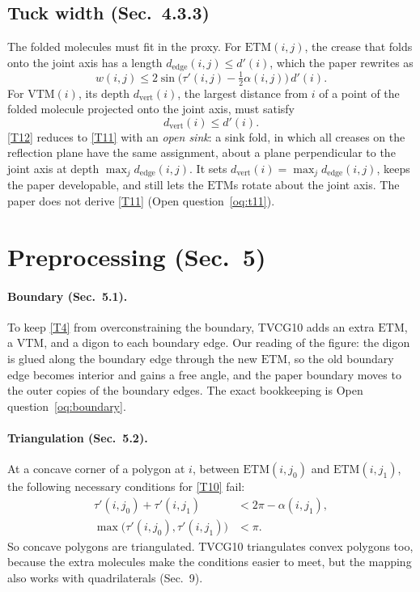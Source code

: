 \documentclass[11pt]{article}
\theoremstyle{definition}
\newcommand{\ETM}{\mathrm{ETM}}
\newcommand{\VTM}{\mathrm{VTM}}
\begin{document}
\subsection{Tuck width (Sec.~4.3.3)}

The folded molecules must fit in the proxy. For $\ETM(i,j)$, the crease that
folds onto the joint axis has a length $d_{\mathrm{edge}}(i,j) \le d'(i)$, which
the paper rewrites as
\begin{equation}
  w(i,j) \le 2 \sin\bigl(\tau'(i,j) - \tfrac12\alpha(i,j)\bigr)\, d'(i).
  \tag{T11}\label{T11}
\end{equation}
For $\VTM(i)$, its depth $d_{\mathrm{vert}}(i)$, the largest distance from $i$
of a point of the folded molecule projected onto the joint axis, must satisfy
\begin{equation}
  d_{\mathrm{vert}}(i) \le d'(i). \tag{T12}\label{T12}
\end{equation}
\eqref{T12} reduces to \eqref{T11} with an \emph{open sink}: a sink fold, in
which all creases on the reflection plane have the same assignment, about a
plane perpendicular to the joint axis at depth $\max_j d_{\mathrm{edge}}(i,j)$.
It sets $d_{\mathrm{vert}}(i) = \max_j d_{\mathrm{edge}}(i,j)$, keeps the paper
developable, and still lets the $\ETM$s rotate about the joint axis. The paper
does not derive \eqref{T11} (Open question~\ref{oq:t11}).

\section{Preprocessing (Sec.~5)}

\paragraph{Boundary (Sec.~5.1).} To keep \eqref{T4} from overconstraining the
boundary, TVCG10 adds an extra $\ETM$, a $\VTM$, and a digon to each boundary
edge. Our reading of the figure: the digon is glued along the boundary edge
through the new $\ETM$, so the old boundary edge becomes interior and gains a
free angle, and the paper boundary moves to the outer copies of the boundary
edges. The exact bookkeeping is Open question~\ref{oq:boundary}.

\paragraph{Triangulation (Sec.~5.2).} At a concave corner of a polygon at $i$,
between $\ETM(i,j_0)$ and $\ETM(i,j_1)$, the following necessary conditions for
\eqref{T10} fail:
\begin{align}
  \tau'(i,j_0) + \tau'(i,j_1) &< 2\pi - \alpha(i,j_1), \tag{T13}\label{T13}\\
  \max\bigl(\tau'(i,j_0), \tau'(i,j_1)\bigr) &< \pi. \tag{T14}\label{T14}
\end{align}
So concave polygons are triangulated. TVCG10 triangulates convex polygons too,
because the extra molecules make the conditions easier to meet, but the mapping
also works with quadrilaterals (Sec.~9).
\end{document}
